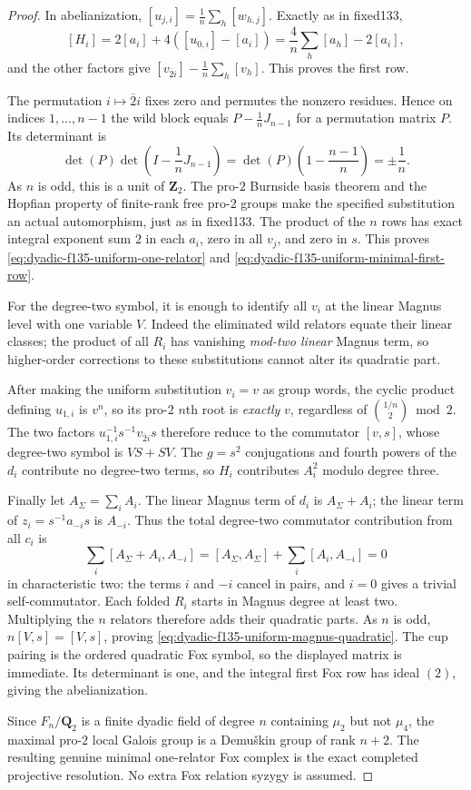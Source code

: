 \begin{proof}
In abelianization,
$[u_{j,i}]=
\frac1n\sum_h[w_{h,j}]$.
Exactly as in fixed133,
\[
[H_i]=2[a_i]+4([u_{0,i}]-[a_i])
=\frac4n\sum_h[a_h]-2[a_i],
\]
and the other factors give
$[v_{\overline2i}]-\frac1n\sum_h[v_h]$.
This proves the first row.

The permutation
$i\mapsto\overline2 i$
fixes zero and permutes
the nonzero residues.
Hence on indices $1,\dots,n-1$
the wild block equals
$P-\frac1nJ_{n-1}$
for a permutation matrix $P$.
Its determinant is
\[
\det(P)\det\left(
I-\frac1nJ_{n-1}\right)
=\det(P)\left(1-\frac{n-1}{n}\right)
=\pm\frac1n.
\]
As $n$ is odd, this is
a unit of $\mathbf Z_2$.
The pro-$2$ Burnside
basis theorem and the
Hopfian property of finite-rank
free pro-$2$ groups make the
specified substitution an
actual automorphism, just as
in fixed133.  The product
of the $n$ rows has
exact integral exponent
sum $2$ in each $a_i$,
zero in all $v_j$,
and zero in $s$.
This proves
\eqref{eq:dyadic-f135-uniform-one-relator}
and
\eqref{eq:dyadic-f135-uniform-minimal-first-row}.

For the degree-two symbol,
it is enough to identify
all $v_i$ at the linear
Magnus level with one
variable $V$.
Indeed the eliminated
wild relators equate
their linear classes;
the product of all $R_i$
has vanishing \emph{mod-two
linear} Magnus term,
so higher-order corrections
to these substitutions
cannot alter its quadratic
part.

After making the uniform
substitution $v_i=v$ as
group words, the cyclic
product defining $u_{1,i}$
is $v^n$, so its pro-$2$
$n$th root is \emph{exactly}
$v$, regardless of
$\binom{1/n}{2}\bmod2$.
The two factors
$u_{1,i}^{-1}
s^{-1}v_{\overline2i}s$
therefore reduce to
the commutator
$[v,s]$, whose degree-two
symbol is $VS+SV$.
The $g=s^2$ conjugations
and fourth powers of the
$d_i$ contribute no
degree-two terms, so
$H_i$ contributes
$A_i^2$ modulo degree three.

Finally let
$A_\Sigma=\sum_i A_i$.
The linear Magnus term
of $d_i$ is
$A_\Sigma+A_i$;
the linear term
of $z_i=s^{-1}a_{-i}s$
is $A_{-i}$.
Thus the total degree-two
commutator contribution
from all $c_i$ is
\[
\sum_i[A_\Sigma+A_i,A_{-i}]
=[A_\Sigma,A_\Sigma]
+\sum_i[A_i,A_{-i}]=0
\]
in characteristic two:
the terms $i$ and $-i$
cancel in pairs, and
$i=0$ gives a trivial
self-commutator.
Each folded $R_i$ starts
in Magnus degree at least
two.  Multiplying the
$n$ relators therefore
adds their quadratic parts.
As $n$ is odd,
$n[V,s]=[V,s]$,
proving
\eqref{eq:dyadic-f135-uniform-magnus-quadratic}.
The cup pairing is the
ordered quadratic Fox
symbol, so the displayed
matrix is immediate.
Its determinant is one,
and the integral first
Fox row has ideal $(2)$,
giving the abelianization.

Since $F_n/\mathbf Q_2$
is a finite dyadic field
of degree $n$ containing
$\mu_2$ but not $\mu_4$,
the maximal pro-$2$ local
Galois group is a
Demu\v{s}kin group of
rank $n+2$.
The resulting genuine
minimal one-relator
Fox complex is the
exact completed
projective resolution.
No extra Fox relation
syzygy is assumed.
\end{proof}

